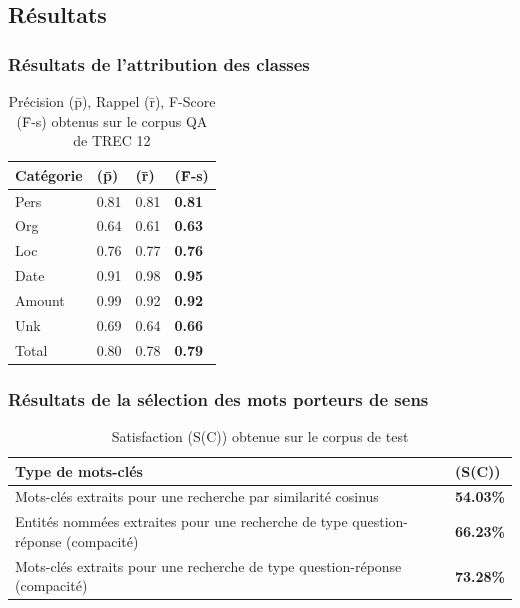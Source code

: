\documentclass[xcolor=dvipsnames]{beamer}
\begin{document}
\subsection{Résultats}
\frame
{
    \frametitle{Résultats de l'attribution des classes}
    \begin{table}[h]
        \begin{center}
            \begin{tabular}{|p{2.5cm}|l|l|l|}
                \hline
                Catégorie & (\={p}) & (\={r}) & (\={F}-s) \\
                \hline
                Pers & 0.81 & 0.81 & \textbf{0.81} \\
                \hline
                Org & 0.64 & 0.61 & \textbf{0.63} \\
                \hline
                Loc & 0.76 & 0.77 & \textbf{0.76} \\
                \hline
                Date & 0.91 & 0.98 & \textbf{0.95} \\
                \hline
                Amount & 0.99 & 0.92 & \textbf{0.92} \\
                \hline
                Unk & 0.69 & 0.64 & \textbf{0.66} \\
                \hline
                \hline
                Total & 0.80 & 0.78 & \textbf{0.79} \\
                \hline
            \end{tabular}
            \caption{Précision (\={p}), Rappel (\={r}), F-Score (\={F}-s) obtenus sur le corpus QA de TREC 12}
        \end{center}
    \end{table}
}
\frame
{
    \frametitle{Résultats de la sélection des mots porteurs de sens}
    \begin{table}[htbp]
        \begin{center}
            \begin{tabular}{|p{8cm}|l|}
                \hline
                Type de mots-clés & (S(C)) \\
                \hline
                Mots-clés extraits pour une recherche par similarité cosinus & \textbf{54.03\%} \\
                \hline
                Entités nommées extraites pour une recherche de type question-réponse (compacité) & \textbf{66.23\%} \\
                \hline
                Mots-clés extraits pour une recherche de type question-réponse (compacité) & \textbf{73.28\%} \\
                \hline
            \end{tabular}
            \caption{Satisfaction (S(C)) obtenue sur le corpus de test}
        \end{center}
    \end{table}
}
\end{document}
